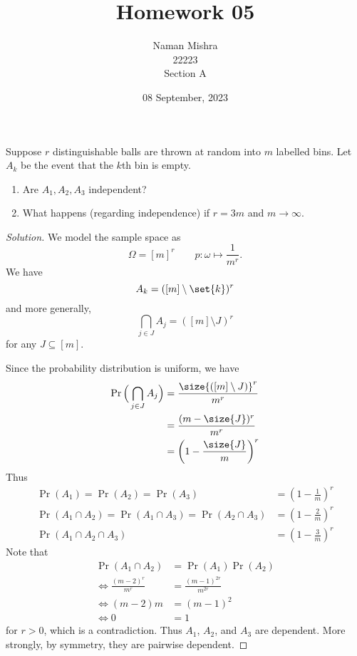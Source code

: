 \documentclass[12pt]{article}
\title{Homework 05}
\author{Naman Mishra\\
    22223\\
    Section A}
\date{08 September, 2023}
\begin{document}
\maketitle

\setcounter{section}{3}
\begin{problem}
    Suppose $r$ distinguishable balls are thrown at random into $m$ labelled
    bins.
    Let $A_k$ be the event that the $k$th bin is empty.
    \begin{enumerate}[label=(\alph*)]
        \item Are $A_1, A_2, A_3$ independent?
        \item What happens (regarding independence) if $r = 3m$ and $m \to \infty$.
    \end{enumerate}
\end{problem}
\begin{proof}[Solution]
    We model the sample space as \[
        \Omega = [m]^{r} \qquad p : \omega \mapsto \frac{1}{m^r}.
    \] We have \[
        A_k = ([m] \setminus \set{k})^r
    \] and more generally, \[
        \bigcap_{j \in J} A_j = ([m] \setminus J)^r
    \] for any $J \subseteq [m]$.

    Since the probability distribution is uniform, we have \begin{align*}
        \Pr\Big(\bigcap_{j \in J} A_j\Big) &= \frac{\size{([m] \setminus J)}^r}{m^r} \\
        &= \frac{(m - \size{J})^{r}}{m^r} \\
        &= \left(1 - \frac{\size{J}}{m}\right)^{r}
    \end{align*}
    Thus \begin{align*}
        \Pr(A_1) = \Pr(A_2) = \Pr(A_3) &= \left(1 - \frac{1}{m}\right)^{r} \\
        \Pr(A_1 \cap A_2) = \Pr(A_1 \cap A_3) = \Pr(A_2 \cap A_3) &= \left(1 - \frac{2}{m}\right)^{r} \\
        \Pr(A_1 \cap A_2 \cap A_3) &= \left(1 - \frac{3}{m}\right)^{r}
    \end{align*}
    Note that \begin{align*}
        \Pr(A_1 \cap A_2) &= \Pr(A_1) \Pr(A_2) \\
        \iff \frac{(m - 2)^r}{m^r} &= \frac{(m - 1)^{2r}}{m^{2r}} \\
        \iff (m - 2) m &= (m - 1)^2 \\
        \iff 0 &= 1
    \end{align*} for $r > 0$, which is a contradiction.
    Thus $A_1$, $A_2$, and $A_3$ are dependent.
    More strongly, by symmetry, they are pairwise dependent.


\end{proof}
\end{document}
